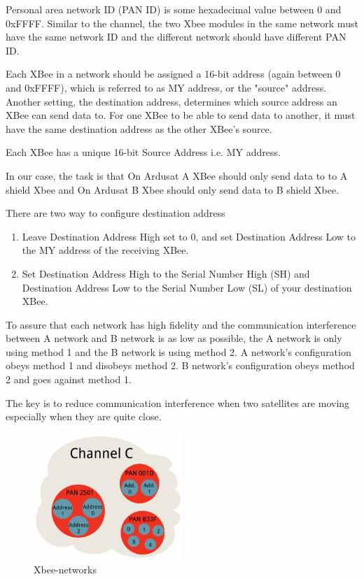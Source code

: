 Personal area network ID (PAN ID) is some hexadecimal value between 0 and 0xFFFF. Similar to the channel, the two Xbee modules in the same network must have the same network ID and the different network should have different PAN ID.

 Each XBee in a network should be assigned a 16-bit address (again between 0 and 0xFFFF), which is referred to as MY address, or the "source" address. Another setting, the destination address, determines which source address an XBee can send data to. For one XBee to be able to send data to another, it must have the same destination address as the other XBee's source.

Each XBee has a unique 16-bit Source Address i.e. MY address.

In our case, the task is that On Ardusat A XBee should only send data to to A shield Xbee and On Ardusat B Xbee should only send data to B shield Xbee.

There are two way to configure destination address
\begin{enumerate}
\item Leave Destination Address High set to 0, and set Destination Address Low to the MY address of the receiving XBee.

\item Set Destination Address High to the Serial Number High (SH) and Destination Address Low to the Serial Number Low (SL) of your destination XBee.
\end{enumerate}
To assure that each network has high fidelity and the communication interference between A network and B network is as low as possible, the A network is only using method 1 and the B network is using method 2. A network's configuration obeys method 1 and disobeys method 2. B network's configuration obeys method 2 and goes against method 1.

The key is to reduce communication interference when two satellites are moving especially when they are quite close.

\begin{figure}[ht]
\centering
\includegraphics[width=0.5\textwidth]{fig/DOE/Network}
\caption{Xbee-networks}
\end{figure}

